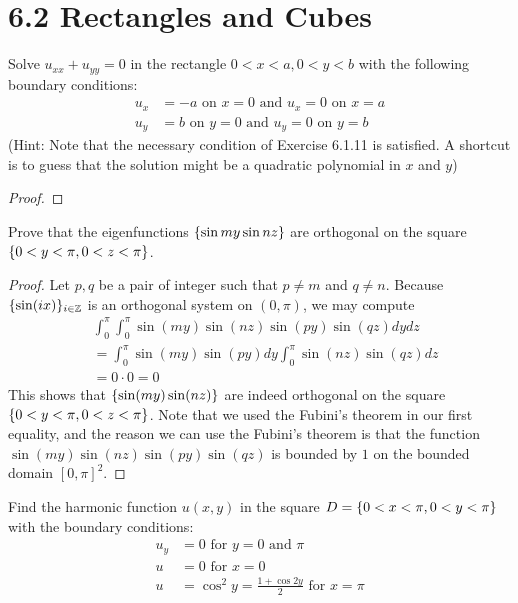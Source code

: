 \documentclass{report}
\begin{document}
\section{6.2 Rectangles and Cubes}
\begin{question}{}{}
Solve $u_{xx}+u_{yy}=0$ in the rectangle $0<x<a,0<y<b$ with the following boundary conditions: 
 \begin{align*}
u_x&=-a\text{ on }x=0 \text{ and }u_x=0\text{ on }x=a \\
u_y&=b\text{ on }y=0\text{ and }u_y=0\text{ on }y=b
\end{align*}
(Hint: Note that the necessary condition of Exercise 6.1.11 is satisfied. A shortcut is to guess that the solution might be a quadratic polynomial in $x$ and $y$)
\end{question}
\begin{proof}

\end{proof}
\begin{question}{}{}
Prove that the eigenfunctions $\{ \sin my \sin nz \}$ are orthogonal on the square $\{ 0<y<\pi  , 0 <z<\pi  \}$. 
\end{question}
\begin{proof}
Let $p,q$ be a pair of integer such that $p\neq m$ and $q\neq n$. Because $\{ \sin (ix) \}_{i\in\mathbb{Z}}$ is an orthogonal system on $(0,\pi )$, we may compute 
\begin{align*}
&\int_0^{\pi }\int_0^{\pi } \sin (my)\sin (nz) \sin (py)\sin (qz)dydz \\
&= \int_0^{\pi } \sin (my)\sin (py)dy \int_0^{\pi } \sin (nz)\sin (qz)dz \\
&=0 \cdot 0=0 
\end{align*}
This shows that $\{ \sin (my) \sin (nz) \}$ are indeed orthogonal on the square $\{ 0<y<\pi ,0<z<\pi  \}$. Note that we used the Fubini's theorem in our first equality, and the reason we can use the Fubini's theorem is that the function $\sin (my)\sin (nz)\sin (py)\sin (qz)$ is bounded by $1$ on the bounded domain  $[0,\pi ]^2$. 
\end{proof}
\begin{question}{}{}
Find the harmonic function $u(x,y)$ in the square $D= \{ 0<x<\pi  ,0 <y< \pi  \}$ with the boundary conditions: 
\begin{align*}
u_y&=0\text{ for }y=0\text{ and }\pi   \\
u&=0\text{ for }x=0\\
u&=\cos^2 y = \frac{1+ \cos 2y}{2}\text{ for }x=\pi 
\end{align*}
\end{question}
\end{document}
